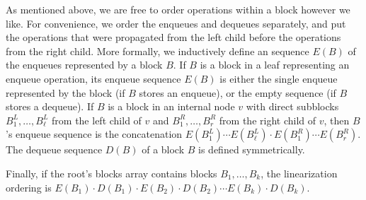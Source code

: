 As mentioned above, we are free to order operations within a block however we like.
For convenience, we order the enqueues and dequeues separately, and put the 
operations that were propagated from the left child before the operations from the right child.
More formally, we inductively define an sequence $E(B)$ of the enqueues represented by a block $B$.
If $B$ is a block in a leaf representing an enqueue operation, its enqueue sequence $E(B)$ is either the single
enqueue represented by the block (if $B$ stores an enqueue), or the empty sequence (if $B$ stores a dequeue).
If $B$ is a block in an internal node $v$ with direct subblocks $B^L_1, \ldots, B^L_\ell$ from the left child of $v$
and $B^R_1,\ldots,B^R_r$ from the right child of $v$, then $B$'s enqueue sequence is the concatenation $E(B^L_1)\cdots E(B^L_\ell)\cdot E(B^R_1) \cdots E(B^R_r)$.
The dequeue sequence $D(B)$ of a block $B$ is defined symmetrically.

Finally, if the root's blocks array contains blocks $B_1, \ldots, B_k$, the 
linearization ordering is 
$E(B_1)\cdot D(B_1) \cdot E(B_2) \cdot D(B_2) \cdots E(B_k) \cdot D(B_k)$.



